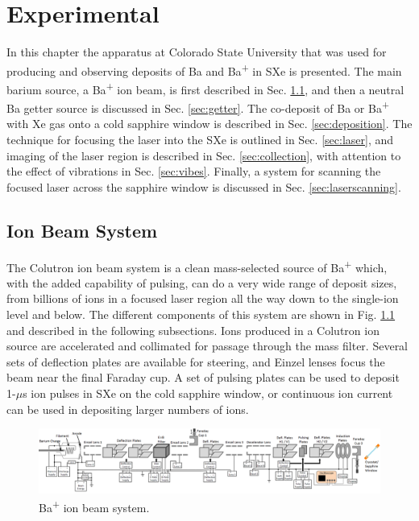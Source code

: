 \chapter{Experimental}



In this chapter the apparatus at Colorado State University that was used for producing and observing  deposits of Ba and Ba\textsuperscript{+} in SXe is presented.  The main barium source, a Ba\textsuperscript{+} ion beam, is first described in Sec. \ref{sec:ionbeam}, and then a neutral Ba getter source is discussed in Sec. \ref{sec:getter}.  The co-deposit of Ba or Ba\textsuperscript{+} with Xe gas onto a cold sapphire window is described in Sec. \ref{sec:deposition}.  The technique for focusing the laser into the SXe is outlined in Sec. \ref{sec:laser}, and imaging of the laser region is described in Sec. \ref{sec:collection}, with attention to the effect of vibrations in Sec. \ref{sec:vibes}.  Finally, a system for scanning the focused laser across the sapphire window is discussed in Sec. \ref{sec:laserscanning}.

\section{Ion Beam System}
\label{sec:ionbeam}

The Colutron ion beam system is a clean mass-selected source of Ba\textsuperscript{+} which, with the added capability of pulsing, can do a very wide range of deposit sizes, from billions of ions in a focused laser region all the way down to the single-ion level and below.  The different components of this system are shown in Fig. \ref{fig:ionbeam} and described in the following subsections.  Ions produced in a Colutron ion source are accelerated and collimated for passage through the mass filter.  Several sets of deflection plates are available for steering, and Einzel lenses focus the beam near the final Faraday cup.  A set of pulsing plates can be used to deposit 1-$\mu$s ion pulses in SXe on the cold sapphire window, or continuous ion current can be used in depositing larger numbers of ions.

\vspace{20mm}

\begin{figure} %
        \centering
                \includegraphics[angle=90,width=.25\textwidth]{figures/ionBeam.png} %
                \caption{Ba\textsuperscript{+} ion beam system.}
\label{fig:ionbeam}
\end{figure}

